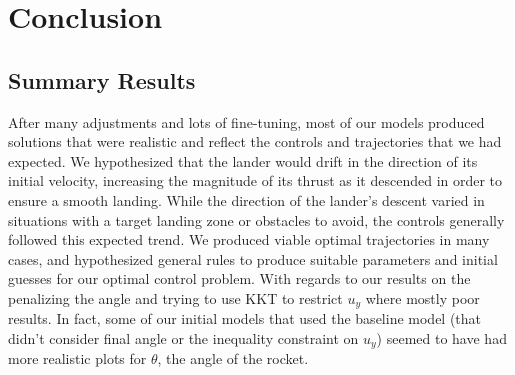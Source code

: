 \documentclass{article}
\begin{document}
\section{Conclusion}

\subsection{Summary Results}
After many adjustments and lots of fine-tuning, most of our models produced solutions that were realistic and reflect the controls and trajectories that we had expected. We hypothesized that the lander would drift in the direction of its initial velocity, increasing the magnitude of its thrust as it descended in order to ensure a smooth landing. While the direction of the lander's descent varied in situations with a target landing zone or obstacles to avoid, the controls generally followed this expected trend. We produced viable optimal trajectories in many cases, and hypothesized general rules to produce suitable parameters and initial guesses for our optimal control problem. 
With regards to our results on the penalizing the angle and trying to use KKT to restrict $u_y$ where mostly poor results. In fact, some of our initial models that used the baseline model (that didn't consider final angle  or the inequality constraint on $u_y$) seemed to have had more realistic plots for $\theta$, the angle of the rocket.
\end{document}
